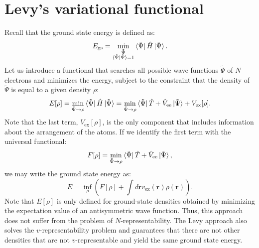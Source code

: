 \documentclass[../Main/chem532-notes.tex]{subfiles}
\begin{document}
\section{Levy's variational functional}
Recall that the ground state energy is defined as:
\begin{equation}
E_\mathrm{gs} = \min_{
\substack{\tilde{\Psi}\\ \braket{\tilde{\Psi}|\tilde{\Psi}} = 1}
} \bra{\tilde{\Psi}}\hat{H} \ket{\tilde{\Psi}}.
\end{equation}
Let us introduce a functional that searches all possible wave functions $\tilde{\Psi}$ of $N$ electrons and minimizes the energy, subject to the constraint that the density of $\tilde{\Psi}$ is equal to a given density $\rho$:
\begin{equation}
E[\rho] = \min_{\tilde{\Psi} \rightarrow \rho} \bra{\tilde{\Psi}}\hat{H} \ket{\tilde{\Psi}}
= \min_{\tilde{\Psi} \rightarrow \rho} \bra{\tilde{\Psi}}\hat{T} + \hat{V}_\mathrm{ee} \ket{\tilde{\Psi}} + V_\mathrm{ex}[\rho].
\end{equation}
Note that the last term, $V_\mathrm{ex}[\rho]$, is the only component that includes information about the arrangement of the atoms.
If we identify the first term with the universal functional:
\begin{equation}
F[\rho] = \min_{\tilde{\Psi} \rightarrow \rho} \bra{\tilde{\Psi}}\hat{T} + \hat{V}_\mathrm{ee} \ket{\tilde{\Psi}},
\end{equation}
we may write the ground state energy as:
\begin{equation}
E = \inf_\rho \left(F[\rho] + \int d\mathbf{r} v_\mathrm{ex}(\mathbf{r}) \rho(\mathbf{r}) \right).
\end{equation}
Note that $E[\rho]$ is only defined for ground-state densities obtained by minimizing the expectation value of an antisymmetric wave function. Thus, this approach does not suffer from the problem of $N$-representability.
The Levy approach also solves the $v$-representability problem and guarantees that there are not other densities that are not $v$-representable and yield the same ground state energy.
\end{document}
